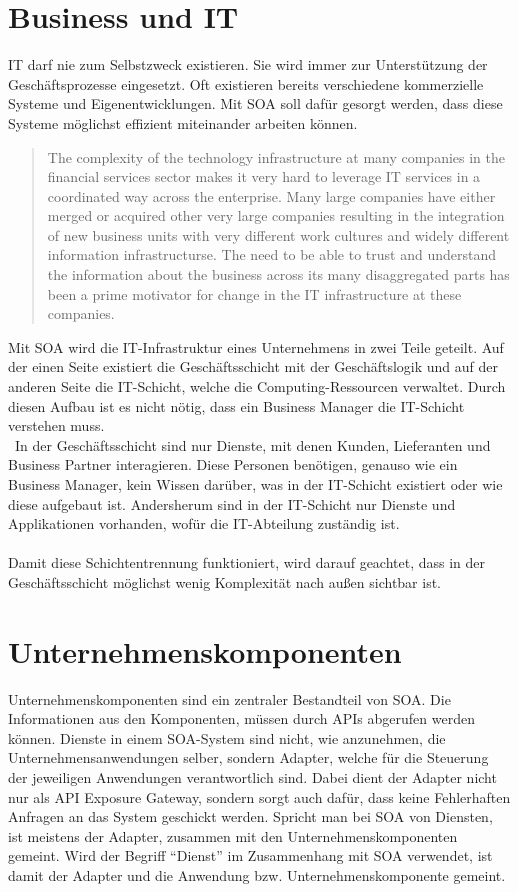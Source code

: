 \section{Business und IT}
\label{sec:BusinessAndIT}
IT darf nie zum Selbstzweck existieren. Sie wird immer zur Unterstützung der Geschäftsprozesse eingesetzt. Oft existieren bereits verschiedene kommerzielle Systeme und Eigenentwicklungen. Mit SOA soll dafür gesorgt werden, dass diese Systeme möglichst effizient miteinander arbeiten können.
\begin{quotation}
    \frqq The complexity of the technology infrastructure at many companies in the financial services sector makes it very hard to leverage IT services in a coordinated way across the enterprise. Many large companies have either merged or acquired other very large companies resulting in the integration of new business units with very different work cultures and widely different information infrastructurse. The need to be able to trust and understand the information about the business across its many disaggregated parts has been a prime motivator for change in the IT infrastructure at these companies.\flqq\  \cite[S. 17]{SOAForDummies}
\end{quotation}

Mit SOA wird die IT-Infrastruktur eines Unternehmens in zwei Teile geteilt. Auf der einen Seite existiert die Geschäftsschicht mit der Geschäftslogik und auf der anderen Seite die IT-Schicht, welche die Computing-Ressourcen verwaltet. Durch diesen Aufbau ist es nicht nötig, dass ein Business Manager die IT-Schicht verstehen muss.
\\\
In der Geschäftsschicht sind nur Dienste, mit denen Kunden, Lieferanten und Business Partner interagieren. Diese Personen benötigen, genauso wie ein Business Manager, kein Wissen darüber, was in der IT-Schicht existiert oder wie diese aufgebaut ist. Andersherum sind in der IT-Schicht nur Dienste und Applikationen vorhanden, wofür die IT-Abteilung zuständig ist.
\\\\
Damit diese Schichtentrennung funktioniert, wird darauf geachtet, dass in der Geschäftsschicht möglichst wenig Komplexität nach außen sichtbar ist.

\section{Unternehmenskomponenten}
\label{sec:UnternehmensKomponenten}
Unternehmenskomponenten sind ein zentraler Bestandteil von SOA. Die Informationen aus den Komponenten, müssen durch APIs abgerufen werden können. Dienste in einem SOA-System sind nicht, wie anzunehmen, die Unternehmensanwendungen selber, sondern Adapter, welche für die Steuerung der jeweiligen Anwendungen verantwortlich sind. Dabei dient der Adapter nicht nur als API Exposure Gateway, sondern sorgt auch dafür, dass keine Fehlerhaften Anfragen an das System geschickt werden. Spricht man bei SOA von Diensten, ist meistens der Adapter, zusammen mit den Unternehmenskomponenten gemeint. Wird der Begriff "`Dienst"' im Zusammenhang mit SOA verwendet, ist damit der Adapter und die Anwendung bzw. Unternehmenskomponente gemeint.


